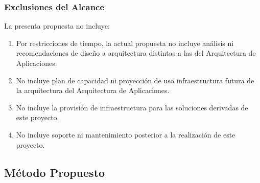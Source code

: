 \documentclass[
	a4paper, %
	12pt, %
]{include/CSSullivanBusinessReport}
\def\tightlist{}
\begin{document}
\subsubsection{Exclusiones del
Alcance}\label{sec:exclusiones-del-alcance}

La presenta propuesta no incluye:

\begin{enumerate}
\def\labelenumi{\arabic{enumi}.}
\tightlist
\item
  Por restricciones de tiempo, la actual propuesta no incluye análisis
  ni recomendaciones de diseño a arquitectura distintas a las del
  Arquitectura de Aplicaciones.
\item
  No incluye plan de capacidad ni proyección de uso infraestructura
  futura de la arquitectura del Arquitectura de Aplicaciones.
\item
  No incluye la provisión de infraestructura para las soluciones
  derivadas de este proyecto.
\item
  No incluye soporte ni mantenimiento posterior a la realización de este
  proyecto.
\end{enumerate}

\subsection{Método Propuesto}\label{sec:muxe9todo-propuesto}

\begin{quote}
\end{quote}
\end{document}

